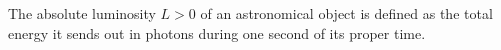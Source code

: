 The absolute luminosity $L > 0$ of an astronomical object is defined as the total energy it sends out in photons during one second of its proper time.
